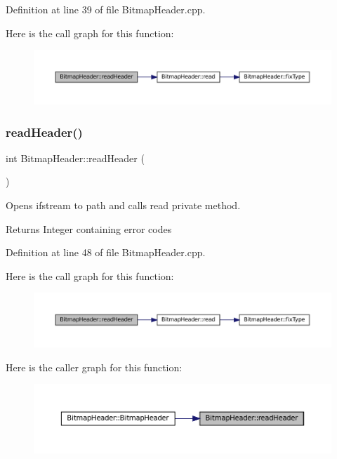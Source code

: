 Definition at line 39 of file Bitmap\+Header.\+cpp.

Here is the call graph for this function\+:
\nopagebreak
\begin{figure}[H]
\begin{center}
\leavevmode
\includegraphics[width=350pt]{classBitmapHeader_a2de360d5111136167f5885bed561bc8c_cgraph}
\end{center}
\end{figure}
\mbox{\label{classBitmapHeader_a66adc11592dc1d18edbd46bade1db242}} 
\subsubsection{\texorpdfstring{readHeader()}{readHeader()}\hspace{0.1cm}{\footnotesize\ttfamily [2/2]}}
{\footnotesize\ttfamily int Bitmap\+Header\+::read\+Header (\begin{DoxyParamCaption}{ }\end{DoxyParamCaption})}



Opens ifstream to path and calls read private method. 

\begin{DoxyReturn}{Returns}
Integer containing error codes 
\end{DoxyReturn}


Definition at line 48 of file Bitmap\+Header.\+cpp.

Here is the call graph for this function\+:
\nopagebreak
\begin{figure}[H]
\begin{center}
\leavevmode
\includegraphics[width=350pt]{classBitmapHeader_a66adc11592dc1d18edbd46bade1db242_cgraph}
\end{center}
\end{figure}
Here is the caller graph for this function\+:
\nopagebreak
\begin{figure}[H]
\begin{center}
\leavevmode
\includegraphics[width=350pt]{classBitmapHeader_a66adc11592dc1d18edbd46bade1db242_icgraph}
\end{center}
\end{figure}


